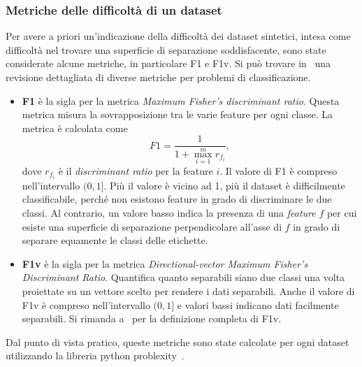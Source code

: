 \subsubsection{Metriche delle difficoltà di un dataset}\label{sec:metriche_dataset}
Per avere a priori un'indicazione della difficoltà dei dataset sintetici, intesa come difficoltà nel trovare una superficie di separazione soddisfacente, sono state considerate alcune metriche, in particolare F1 e F1v. Si può trovare in~\cite{ds_complexity} una revisione dettagliata di diverse metriche per problemi di classificazione.
\begin{itemize}
    \item \textbf{F1} è la sigla per la metrica \emph{Maximum Fisher’s discriminant ratio}. Questa metrica misura la sovrapposizione tra le varie feature per ogni classe.
    La metrica è calcolata come
    \begin{equation*}
        F1=\frac{1}{1+\max_{i=1}^{m}r_{f_{i}}},
    \end{equation*}
    dove $r_{f_{i}}$ è il \emph{discriminant ratio} per la feature $i$.
    Il valore di F1 è compreso nell'intervallo $(0,1]$. Più il valore è vicino ad 1, più il dataset è difficilmente classificabile, perché non esistono feature in grado di discriminare le due classi. Al contrario, un valore basso indica la presenza di una \emph{feature} $f$ per cui esiste una superficie di separazione perpendicolare all'asse di $f$ in grado di separare equamente le classi delle etichette.
    \item \textbf{F1v} è la sigla per la metrica \emph{Directional-vector Maximum Fisher’s Discriminant Ratio}. Quantifica quanto separabili siano due classi una volta proiettate su un vettore scelto per rendere i dati separabili.
    Anche il valore di F1v è compreso nell'intervallo $(0,1]$ e valori bassi indicano dati facilmente separabili.    
    Si rimanda a~\cite{ds_complexity} per la definizione completa di F1v.
\end{itemize}

Dal punto di vista pratico, queste metriche sono state calcolate per ogni dataset utilizzando la libreria python problexity~\cite{problexity}.


